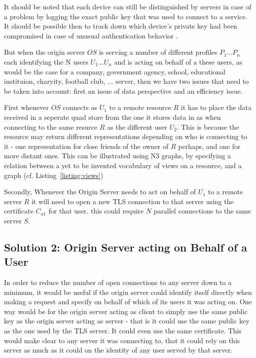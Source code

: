 \documentclass[a4paper]{llncs}
\begin{document}
It should be noted that each device can still be distinguished by servers in case of a problem by logging the exact public key that was used to connect to a service. 
It should be possible then to track down which device's private key had been compromised in case of unusual authentication behavior . 

But when the origin server $OS$ is serving a number of different profiles $P_1 \ldots P_n$ each identifying the N users $U_1 \ldots U_n$ and is acting on behalf of a these users, as would be the case for a company, government agency, school, educational instituion, charyity, football club, ... server, then we have two issues that need to be taken into account: first an issue of data perspective and an efficiency issue. 

First whenever $OS$ connects as $U_1$ to a remote resource $R$ it has to place the data received in a seperate quad store from the one it stores data in as when connecting to  the same resurce $R$ as the different user $U_2$. 
This is because the resource may return different representations depending on who is connecting to it - one representation for close friends of the owner of $R$ perhaps, and one for more distant ones. 
This can be illustrated using N3 graphs, by specifying a relation between a yet to be invented vocabulary of views on a resource, and a graph (cf. Listing~\ref{listing:views})


Secondly, Whenever the Origin Server needs to act on behalf of $U_1$ to a remote server $R$ it will need to open a new TLS connection to that server using the certificate $C_{u1}$ for that user.
 this could require $N$ parallel connections to the same server $S$.
 
\subsection{Solution 2: Origin Server acting on Behalf of a User}

In order to reduce the number of open connections to any server down to a minimum, it would be useful if the origin server could identify itself directly when making a request and specify on behalf of which of its users it was acting on.
One way would be for the origin server acting as client to simply use the same public key as the origin server acting as server - that is it could use the same public key as the one used by the TLS server.
It could even use the same certificate.
This would make clear to any server it was connecting to, that it could rely on this server as much as it could on the identity of any user served by that server.
\end{document}
